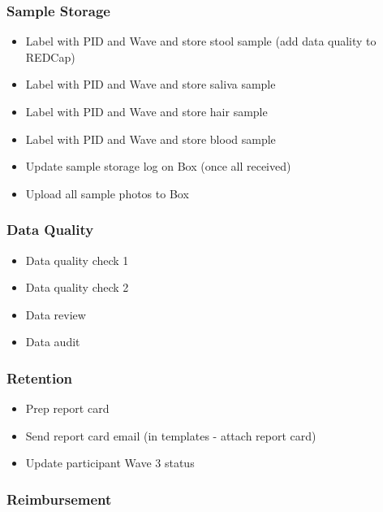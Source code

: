 \documentclass[
]{book}
\providecommand{\tightlist}{%
  \setlength{\itemsep}{0pt}\setlength{\parskip}{0pt}}
\begin{document}
\hypertarget{sample-storage-3}{%
\subsubsection{Sample Storage}\label{sample-storage-3}}

\begin{itemize}
\tightlist
\item
  Label with PID and Wave and store stool sample (add data quality to REDCap)
\item
  Label with PID and Wave and store saliva sample
\item
  Label with PID and Wave and store hair sample
\item
  Label with PID and Wave and store blood sample
\item
  Update sample storage log on Box (once all received)
\item
  Upload all sample photos to Box
\end{itemize}

\hypertarget{data-quality-3}{%
\subsubsection{Data Quality}\label{data-quality-3}}

\begin{itemize}
\tightlist
\item
  Data quality check 1
\item
  Data quality check 2
\item
  Data review
\item
  Data audit
\end{itemize}

\hypertarget{retention-2}{%
\subsubsection{Retention}\label{retention-2}}

\begin{itemize}
\tightlist
\item
  Prep report card
\item
  Send report card email (in templates - attach report card)
\item
  Update participant Wave 3 status
\end{itemize}

\hypertarget{reimbursement-2}{%
\subsubsection{Reimbursement}\label{reimbursement-2}}
\end{document}
